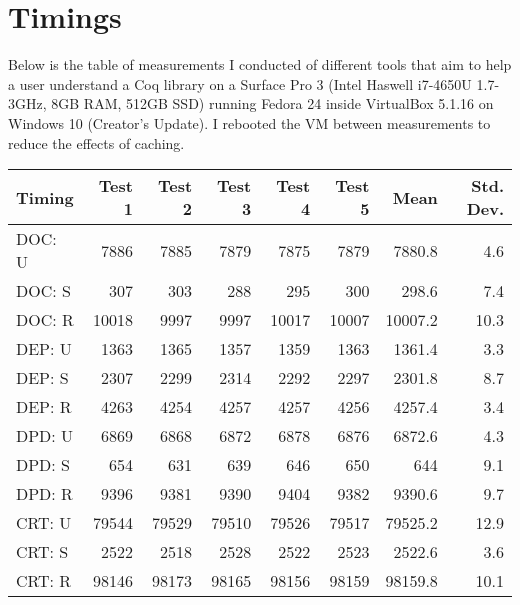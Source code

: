 \chapter{Timings}\label{chapter:timings}

Below is the table of measurements I conducted of different tools that aim to
help a user understand a Coq library on a Surface Pro 3 (Intel Haswell i7-4650U
1.7-3GHz, 8GB RAM, 512GB SSD) running Fedora 24 inside VirtualBox 5.1.16 on
Windows 10 (Creator's Update). I rebooted the VM between measurements to reduce
the effects of caching.

\begin{table}[h]

  \centering
  \small
  \begin{tabular*}{\textwidth}{@{\extracolsep{\fill}} lrrrrrrr}

    \toprule

    \textbf{Timing} & \textbf{Test 1}	& \textbf{Test 2}	& \textbf{Test 3}	&
    \textbf{Test 4}	& \textbf{Test 5}	& \textbf{Mean} & \textbf{Std. Dev.} \\

    \midrule

    DOC: U & 7886    & 7885    & 7879    & 7875    & 7879    & 7880.8    & 4.6 \\
    DOC: S & 307     & 303     & 288     & 295     & 300     & 298.6     & 7.4 \\
    DOC: R & 10018   & 9997    & 9997    & 10017   & 10007   & 10007.2   & 10.3 \\

    DEP: U & 1363    & 1365    & 1357    & 1359    & 1363    & 1361.4    & 3.3 \\
    DEP: S & 2307    & 2299    & 2314    & 2292    & 2297    & 2301.8    & 8.7 \\
    DEP: R & 4263    & 4254    & 4257    & 4257    & 4256    & 4257.4    & 3.4 \\

    DPD: U & 6869    & 6868    & 6872    & 6878    & 6876    & 6872.6    & 4.3 \\
    DPD: S & 654     & 631     & 639     & 646     & 650     & 644       & 9.1 \\
    DPD: R & 9396    & 9381    & 9390    & 9404    & 9382    & 9390.6    & 9.7 \\

    CRT: U & 79544   & 79529   & 79510   & 79526   & 79517   & 79525.2   & 12.9 \\
    CRT: S & 2522    & 2518    & 2528    & 2522    & 2523    & 2522.6    & 3.6 \\
    CRT: R & 98146   & 98173   & 98165   & 98156   & 98159   & 98159.8   & 10.1 \\


\end{tabular*}
\end{table}
